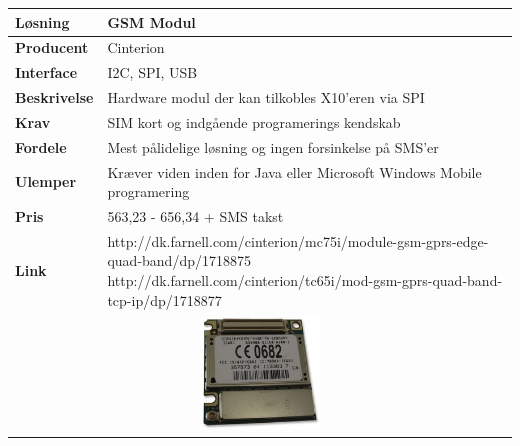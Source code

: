 \begin{table}[!htbp] \centering
	\label{tab:GSM1}
\begin{tabular}{|p{6cm}|p{8cm}|}
	\hline
		\textbf{Løsning}				&GSM Modul \\ \hline
		\textbf{Producent} 			&Cinterion \\ \hline
		\textbf{Interface} 			&I2C, SPI, USB \\ \hline
		\textbf{Beskrivelse} 		&Hardware modul der kan tilkobles X10'eren via SPI \\ \hline
		\textbf{Krav} 				&SIM kort og indgående programerings kendskab \\ \hline
		\textbf{Fordele}				&Mest pålidelige løsning og ingen forsinkelse på SMS'er \\ \hline
		\textbf{Ulemper} 			&Kræver viden inden for Java eller Microsoft Windows Mobile programering \\ \hline
		\textbf{Pris} 				&563,23 - 656,34 + SMS takst \\ \hline
		\textbf{Link} 				&http://dk.farnell.com/cinterion/mc75i/module-gsm-gprs-edge-quad-band/dp/1718875 \newline
									 http://dk.farnell.com/cinterion/tc65i/mod-gsm-gprs-quad-band-tcp-ip/dp/1718877 \\ \hline
		\multicolumn{2}{|c|}{
			\includegraphics[height=3cm]{billeder/GSM_TC65I.jpg}} \\ \hline
\end{tabular}
\end{table}

